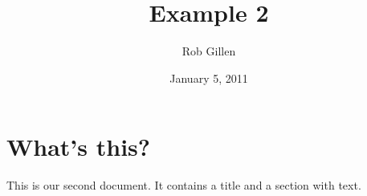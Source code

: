 \documentclass[a4paper,11pt]{article}
\begin{document}
\title{Example 2}
\author{Rob Gillen}
\date{January 5, 2011}
\maketitle
\section{What's this?}
This is our second document. It contains a title and a section with text.
\end{document}
